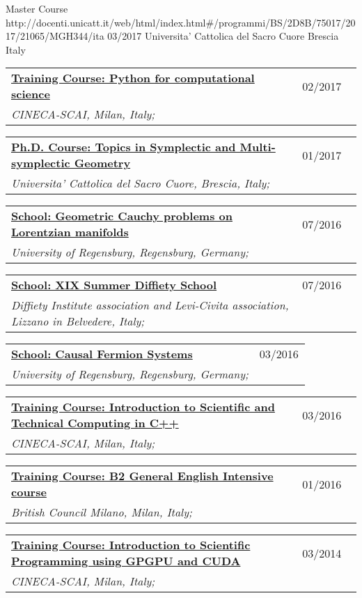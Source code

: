 \documentclass[a4paper]{article}
\newcommand{\longvoice}[8]{
	\begin{tabular}{p{0.83\linewidth} p{0.17\linewidth} }
		\textbf{\href{#3}{#2: #1}} & #4 
		\\ 
		\textit{#5, #6, #7;} & {\small\emph{#8}}
	\end{tabular}
	\vspace{.5em}
}
\begin{document}
		{Master Course}
		{http://docenti.unicatt.it/web/html/index.html\#/programmi/BS/2D8B/75017/2017/21065/MGH344/ita}
		{03/2017}
		{Universita' Cattolica del Sacro Cuore}
		{Brescia}
		{Italy}
		{}
	\longvoice{Python for computational science}
		{Training Course}
		{https://web.archive.org/web/20170623170252/https://eventi.cineca.it/en/hpc/python-computational-science}
		{02/2017}
		{CINECA-SCAI}
		{Milan}
		{Italy}
		{}
	\longvoice{Topics in Symplectic and Multi-symplectic Geometry}
		{Ph.D. Course}
		{https://web.archive.org/save/http://scuoledidottorato.unicatt.it/phdschools/science-10545.html}
		{01/2017}
		{Universita' Cattolica del Sacro Cuore}
		{Brescia}
		{Italy}
		{}
	\longvoice{Geometric Cauchy problems on Lorentzian manifolds}
		{School}
		{https://web.archive.org/web/20170623170457/http://www-app.uni-regensburg.de/Fakultaeten/MAT/GK/index.php/Summer_School_2016}
		{07/2016}
		{University of Regensburg}
		{Regensburg}
		{Germany}
		{}
	\longvoice{XIX Summer Diffiety School}
		{School}
		{https://web.archive.org/web/20170623170547/https://sites.google.com/site/levicivitainstitute//Activities/DiffietySchools/xix-summer-diffiety-school}
		{07/2016}
		{Diffiety Institute association and Levi-Civita association}
		{Lizzano in Belvedere}
		{Italy}
		{}
	\longvoice{Causal Fermion Systems}
		{School}
		{https://web.archive.org/web/20170623170718/http://www.uni-regensburg.de/mathematics/causal-fermion-systems/}
		{03/2016}
		{University of Regensburg}
		{Regensburg}
		{Germany}
		{}
	\longvoice{Introduction to Scientific and Technical Computing in C++}
		{Training Course}
		{https://web.archive.org/save/http://www.hpc.cineca.it/content/introduction-object-oriented}
		{03/2016}
		{CINECA-SCAI}
		{Milan}
		{Italy}
		{}
	\longvoice{B2 General English Intensive course}
		{Training Course}
		{https://www.britishcouncil.it/en/english/courses-adults/general}
		{01/2016}
		{British Council Milano}
		{Milan}
		{Italy}
		{}
	\longvoice{Introduction to Scientific Programming using GPGPU and CUDA}
		{Training Course}
		{https://web.archive.org/web/20170623171128/http://www.hpc.cineca.it/content/introduction-to-gpu}
		{03/2014}
		{CINECA-SCAI}
		{Milan}
		{Italy}
		{}
\end{document}
